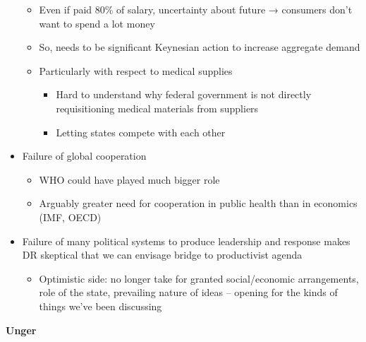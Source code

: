 \begin{itemize}
  \begin{itemize}
  \tightlist
  \item
    Even if paid 80\% of salary, uncertainty about future → consumers
    don't want to spend a lot money
  \item
    So, needs to be significant Keynesian action to increase aggregate
    demand
  \item
    Particularly with respect to medical supplies

    \begin{itemize}
    \tightlist
    \item
      Hard to understand why federal government is not directly
      requisitioning medical materials from suppliers
    \item
      Letting states compete with each other
    \end{itemize}
  \end{itemize}
\item
  Failure of global cooperation

  \begin{itemize}
  \tightlist
  \item
    WHO could have played much bigger role
  \item
    Arguably greater need for cooperation in public health than in
    economics (IMF, OECD)
  \end{itemize}
\item
  Failure of many political systems to produce leadership and response
  makes DR skeptical that we can envisage bridge to productivist agenda

  \begin{itemize}
  \tightlist
  \item
    Optimistic side: no longer take for granted social/economic
    arrangements, role of the state, prevailing nature of ideas --
    opening for the kinds of things we've been discussing
  \end{itemize}
\end{itemize}

\textbf{Unger}

